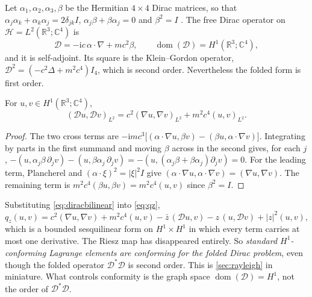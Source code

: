 \documentclass[11pt,a4paper]{article}
\theoremstyle{plain}
\newcommand{\R}{\mathbb{R}}
\newcommand{\C}{\mathbb{C}}
\newcommand{\abs}[1]{\left|#1\right|}
\newcommand{\Hb}{\mathcal{H}}
\newcommand{\Dop}{\mathcal{D}}
\newcommand{\ii}{\mathrm{i}}
\DeclareMathOperator{\dom}{dom}
\begin{document}
Let $\alpha_1,\alpha_2,\alpha_3,\beta$ be the Hermitian $4 \times 4$ Dirac
matrices, so that $\alpha_j\alpha_k + \alpha_k\alpha_j = 2\delta_{jk}I$,
$\alpha_j\beta + \beta\alpha_j = 0$ and $\beta^2 = I$
\cite{Thaller1992}.  The free Dirac operator on $\Hb = L^2(\R^3;\C^4)$
is
\begin{equation}
  \label{eq:diracop}
  \Dop = -\ii c\, \alpha \cdot \nabla + mc^2 \beta,
  \qquad \dom(\Dop) = H^1(\R^3;\C^4),
\end{equation}
and it is self-adjoint.  Its square is the Klein--Gordon operator, $\Dop^2 =
(-c^2\Delta + m^2c^4)I_4$, which is second order.  Nevertheless the folded form
is first order.

\begin{lemma}
  \label{lem:diracform}
  For $u,v \in H^1(\R^3;\C^4)$,
  \begin{equation}
    \label{eq:diracbilinear}
    (\Dop u, \Dop v)_{L^2} = c^2(\nabla u, \nabla v)_{L^2}
      + m^2c^4 (u,v)_{L^2} .
  \end{equation}
\end{lemma}

\begin{proof}
  The two cross terms are $-\ii m c^3\bigl[(\alpha\cdot\nabla u, \beta v) -
  (\beta u, \alpha\cdot\nabla v)\bigr]$.  Integrating by parts in the first
  summand and moving $\beta$ across in the second gives, for each $j$,
  $-(u, \alpha_j\beta\,\partial_j v) - (u, \beta\alpha_j\,\partial_j v)
   = -(u, (\alpha_j\beta + \beta\alpha_j)\partial_j v) = 0$.
  For the leading term, Plancherel and $(\alpha\cdot\xi)^2 = \abs{\xi}^2 I$ give
  $(\alpha\cdot\nabla u, \alpha\cdot\nabla v) = (\nabla u, \nabla v)$.  The
  remaining term is $m^2c^4(\beta u, \beta v) = m^2c^4(u,v)$ since $\beta^2 = I$.
\end{proof}

Substituting \cref{eq:diracbilinear} into \cref{eq:qz},
\begin{equation}
  \label{eq:diracqz}
  q_z(u,v) = c^2(\nabla u, \nabla v) + m^2c^4(u,v)
    - \bar z\,(\Dop u, v) - z\,(u, \Dop v) + \abs{z}^2 (u,v),
\end{equation}
which is a bounded sesquilinear form on $H^1 \times H^1$ in which every term
carries at most one derivative.  The Riesz map has disappeared entirely.  So
\emph{standard $H^1$-conforming Lagrange elements are conforming for the folded
Dirac problem}, even though the folded operator $\Dop^*\Dop$ is second order.
This is \cref{sec:rayleigh} in miniature.  What controls conformity is the graph
space $\dom(\Dop) = H^1$, not the order of $\Dop^*\Dop$.
\end{document}
